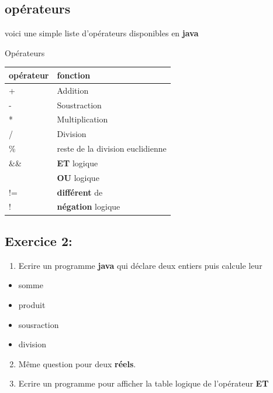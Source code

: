 \documentclass[letterpaper,10pt,english]{sphinxmanual}
\begin{document}
\subsection{opérateurs}
\label{variables:operateurs}
voici une simple liste d'opérateurs disponibles en \textbf{java}


\begin{threeparttable}
\capstart\caption{Opérateurs}

\begin{tabulary}{\linewidth}{|L|L|}
\hline
\textsf{\relax 
opérateur
} & \textsf{\relax 
fonction
}\\
\hline
+
 & 
Addition
\\
\hline
-
 & 
Soustraction
\\
\hline
*
 & 
Multiplication
\\
\hline
/
 & 
Division
\\
\hline
\%
 & 
reste de la division euclidienne
\\
\hline
\&\&
 & 
\textbf{ET} logique
\\
\hline
\textbar{}\textbar{}
 & 
\textbf{OU} logique
\\
\hline
!=
 & 
\textbf{différent} de
\\
\hline
!
 & 
\textbf{négation} logique
\\
\hline\end{tabulary}

\end{threeparttable}



\subsection{Exercice 2:}
\label{variables:exercice-2}\begin{enumerate}
\item {} 
Ecrire un programme \textbf{java} qui déclare deux entiers puis calcule leur

\end{enumerate}
\begin{itemize}
\item {} 
somme

\item {} 
produit

\item {} 
sousraction

\item {} 
division

\end{itemize}
\begin{enumerate}
\setcounter{enumi}{1}
\item {} 
Même question pour deux \textbf{réels}.

\item {} 
Ecrire un programme pour afficher la table logique de l'opérateur \textbf{ET}

\end{enumerate}
\end{document}
